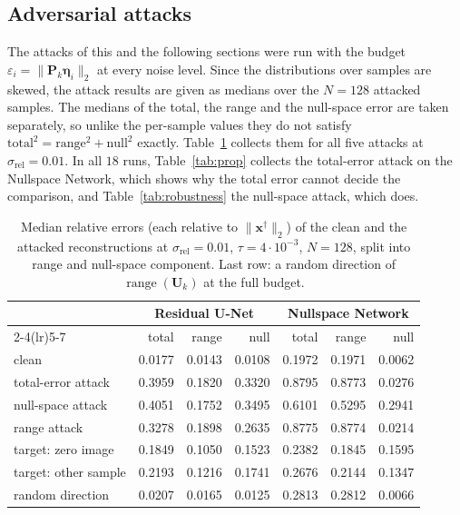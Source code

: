 \documentclass{article}
\numberwithin{equation}{section}
\begin{document}
\subsection{Adversarial attacks}\label{sec:results-general}
The attacks of this and the following sections were run with the budget
$\varepsilon_i=\lVert\mathbf{P}_k\boldsymbol{\eta}_i\rVert_2$ at every noise level. Since the distributions over samples are skewed,
the attack results are given as medians over the $N=128$ attacked samples. The medians of the total,
the range and the null-space error are taken separately, so unlike the per-sample values they do not
satisfy $\text{total}^2=\text{range}^2+\text{null}^2$ exactly. Table~\ref{tab:attacks} collects them for
all five attacks at $\sigma_\text{rel}=0.01$. In all $18$ runs, Table~\ref{tab:prop} collects the
total-error attack on the Nullspace Network, which shows why the total error cannot decide the
comparison, and Table~\ref{tab:robustness} the null-space attack, which does.
\begin{table}[htbp]
\centering
\caption{Median relative errors (each relative to $\lVert\mathbf{x}^\dagger\rVert_2$) of the clean
and the attacked reconstructions at $\sigma_\text{rel}=0.01$, $\tau=4\cdot10^{-3}$, $N=128$,
split into range and null-space component. Last row: a random direction of
$\operatorname{range}(\mathbf{U}_k)$ at the full budget.}\label{tab:attacks}
\begin{tabular}{l rrr rrr}
\toprule
 & \multicolumn{3}{c}{Residual U-Net} & \multicolumn{3}{c}{Nullspace Network} \\
\cmidrule(lr){2-4}\cmidrule(lr){5-7}
 & total & range & null & total & range & null \\
\midrule
clean                  & 0.0177 & 0.0143 & 0.0108 & 0.1972 & 0.1971 & 0.0062 \\
\midrule
total-error attack     & 0.3959 & 0.1820 & 0.3320 & 0.8795 & 0.8773 & 0.0276 \\
null-space attack      & 0.4051 & 0.1752 & 0.3495 & 0.6101 & 0.5295 & 0.2941 \\
range attack           & 0.3278 & 0.1898 & 0.2635 & 0.8775 & 0.8774 & 0.0214 \\
target: zero image     & 0.1849 & 0.1050 & 0.1523 & 0.2382 & 0.1845 & 0.1595 \\
target: other sample   & 0.2193 & 0.1216 & 0.1741 & 0.2676 & 0.2144 & 0.1347 \\
\midrule
random direction       & 0.0207 & 0.0165 & 0.0125 & 0.2813 & 0.2812 & 0.0066 \\
\bottomrule
\end{tabular}
\end{table}
\end{document}
